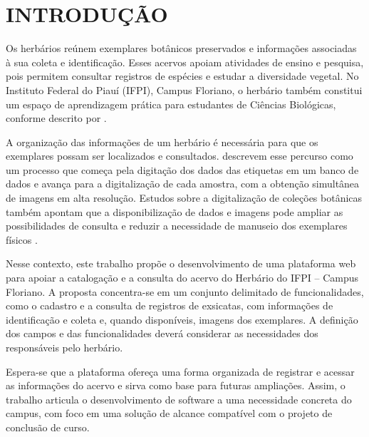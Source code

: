 \documentclass[
    12pt,        %
    openany,     %
    oneside,     %
    a4paper,     %
    english,     %
    french,      %
    spanish,     %
    brazil,      %
    article      %
]{abntex2}
\begin{document}
\frenchspacing




\section{INTRODUÇÃO}
\label{sec:introducao}

Os herbários reúnem exemplares botânicos preservados e informações associadas à sua coleta e identificação. Esses acervos apoiam atividades de ensino e pesquisa, pois permitem consultar registros de espécies e estudar a diversidade vegetal. No Instituto Federal do Piauí (IFPI), Campus Floriano, o herbário também constitui um espaço de aprendizagem prática para estudantes de Ciências Biológicas, conforme descrito por .

A organização das informações de um herbário é necessária para que os exemplares possam ser localizados e consultados.  descrevem esse percurso como um processo que começa pela digitação dos dados das etiquetas em um banco de dados e avança para a digitalização de cada amostra, com a obtenção simultânea de imagens em alta resolução. Estudos sobre a digitalização de coleções botânicas também apontam que a disponibilização de dados e imagens pode ampliar as possibilidades de consulta e reduzir a necessidade de manuseio dos exemplares físicos \cite{thompson2023digitisation,paton2026digitisation}.

Nesse contexto, este trabalho propõe o desenvolvimento de uma plataforma web para apoiar a catalogação e a consulta do acervo do Herbário do IFPI -- Campus Floriano. A proposta concentra-se em um conjunto delimitado de funcionalidades, como o cadastro e a consulta de registros de exsicatas, com informações de identificação e coleta e, quando disponíveis, imagens dos exemplares. A definição dos campos e das funcionalidades deverá considerar as necessidades dos responsáveis pelo herbário.

Espera-se que a plataforma ofereça uma forma organizada de registrar e acessar as informações do acervo e sirva como base para futuras ampliações. Assim, o trabalho articula o desenvolvimento de software a uma necessidade concreta do campus, com foco em uma solução de alcance compatível com o projeto de conclusão de curso.
\end{document}
